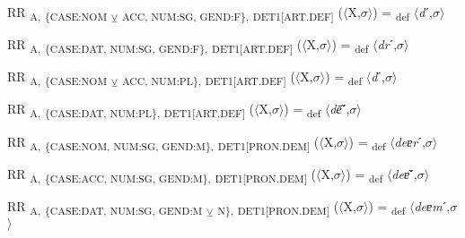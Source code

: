 {\begin{exe}
 RR \textsubscript{A,} \textsubscript{\{CASE:NOM} \textsubscript{${\veebar}$}\textsubscript{ ACC, NUM:SG, GEND:F\},} \textsubscript{DET1[ART.DEF]} ($\langle$X,$\sigma $$\rangle$) = \textsubscript{def} $\langle$\textit{d}ˊ,$\sigma $$\rangle$
\end{exe}

\begin{exe}
 RR \textsubscript{A,} \textsubscript{\{CASE:DAT, NUM:SG, GEND:F\},} \textsubscript{DET1[ART.DEF]} ($\langle$X,$\sigma $$\rangle$) = \textsubscript{def} $\langle$\textit{dr}ˊ,$\sigma $$\rangle$
\end{exe}

\begin{exe}
 RR \textsubscript{A,} \textsubscript{\{CASE:NOM} \textsubscript{${\veebar}$}\textsubscript{ ACC, NUM:PL\},} \textsubscript{DET1[ART.DEF]} ($\langle$X,$\sigma $$\rangle$) = \textsubscript{def} $\langle$\textit{d}ˊ,$\sigma $$\rangle$
\end{exe}

\begin{exe}
 RR \textsubscript{A,} \textsubscript{\{CASE:DAT, NUM:PL\},} \textsubscript{DET1[ART.DEF]} ($\langle$X,$\sigma $$\rangle$) = \textsubscript{def} $\langle$\textit{d\=e͂}ˊ,$\sigma $$\rangle$
\end{exe}

\begin{exe}
 RR \textsubscript{A,} \textsubscript{\{CASE:NOM, NUM:SG, GEND:M\},} \textsubscript{DET1[PRON.DEM]} ($\langle$X,$\sigma $$\rangle$) = \textsubscript{def} $\langle$\textit{deɐr}ˊ,$\sigma $$\rangle$
\end{exe}

\begin{exe}
 RR \textsubscript{A,} \textsubscript{\{CASE:ACC, NUM:SG, GEND:M\},} \textsubscript{DET1[PRON.DEM]} ($\langle$X,$\sigma $$\rangle$) = \textsubscript{def} $\langle$\textit{deɐ͂}ˊ,$\sigma $$\rangle$
\end{exe}

\begin{exe}
 RR \textsubscript{A,} \textsubscript{\{CASE:DAT, NUM:SG, GEND:M} \textsubscript{${\veebar}$}\textsubscript{ N\},} \textsubscript{DET1[PRON.DEM]} ($\langle$X,$\sigma $$\rangle$) = \textsubscript{def} $\langle$\textit{deɐm}ˊ,$\sigma $$\rangle$
\end{exe}

}
